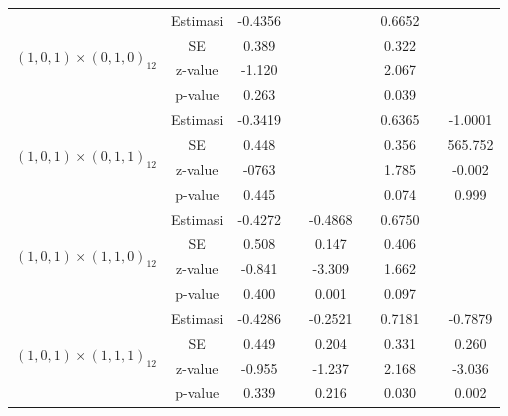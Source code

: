 \begin{enumerate}[label=\alph*.]
\begin{longtable}{|c|c|c|c|c|c|c|c|c|}
            \multirow{4}{*}{$(1,0,1)\times(0,1,0)_{12}$}
            & Estimasi & -0.4356  & {} & {} & {} & 0.6652 & {} & {}\\ \cline{2-9}
            & SE       & 0.389 & {} & {} & {} & 0.322 & {} & {}\\ \cline{2-9}
            & z-value  & -1.120   & {} & {} & {} & 2.067 & {}& {}\\ \cline{2-9}
            & p-value  & 0.263 & {} & {} & {} & 0.039 & {} & {}\\ \hline

            \multirow{4}{*}{$(1,0,1)\times(0,1,1)_{12}$}
            & Estimasi & -0.3419  & {} & {} & {} & 0.6365 & {} & -1.0001\\ \cline{2-9}
            & SE       & 0.448 & {} & {} & {} & 0.356 & {} & 565.752\\ \cline{2-9}
            & z-value  & -0763  & {} & {} & {} & 1.785 & {}& -0.002\\ \cline{2-9}
            & p-value  & 0.445 & {} & {} & {} & 0.074 & {} & 0.999\\ \hline

            \multirow{4}{*}{$(1,0,1)\times(1,1,0)_{12}$}
            & Estimasi & -0.4272  & {} & -0.4868 & {} & 0.6750 & {} & {}\\ \cline{2-9}
            & SE       & 0.508 & {} & 0.147 & {} & 0.406 & {} & {}\\ \cline{2-9}
            & z-value  & -0.841  & {} & -3.309 & {} & 1.662 & {}& {}\\ \cline{2-9}
            & p-value  & 0.400 & {} & 0.001 & {} & 0.097 & {} & {}\\ \hline

            \multirow{4}{*}{$(1,0,1)\times(1,1,1)_{12}$}
            & Estimasi & -0.4286  & {} & -0.2521 & {} & 0.7181 & {} & -0.7879\\ \cline{2-9}
            & SE       & 0.449 & {} & 0.204 & {} & 0.331 & {} & 0.260\\ \cline{2-9}
            & z-value  & -0.955  & {} & -1.237 & {} & 2.168 & {}& -3.036\\ \cline{2-9}
            & p-value  & 0.339 & {} & 0.216 & {} & 0.030 & {} & 0.002\\ \hline


\end{longtable}
\end{enumerate}
